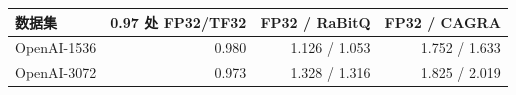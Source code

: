 \begin{tabular}{@{}lrrr@{}}
\toprule
数据集 & 0.97 处 FP32/TF32 & FP32 / RaBitQ & FP32 / CAGRA \\
\midrule
OpenAI-1536 & 0.980 & 1.126 / 1.053 & 1.752 / 1.633 \\
OpenAI-3072 & 0.973 & 1.328 / 1.316 & 1.825 / 2.019 \\
\bottomrule
\end{tabular}
